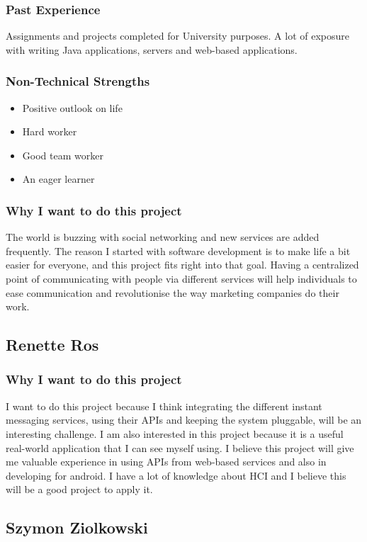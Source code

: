 \subsubsection{Past Experience}
Assignments and projects completed for University purposes. A lot of exposure with writing Java applications, servers and web-based applications.
\subsubsection{Non-Technical Strengths}
\begin{itemize}
	\item{Positive outlook on life}
	\item{Hard worker}
	\item{Good team worker}
	\item{An eager learner}
\end{itemize}
\subsubsection{Why I want to do this project}
The world is buzzing with social networking and new services are added frequently. The reason I started with software development is to make life a bit easier for everyone, and this project fits right into that goal. Having a centralized point of communicating with people via different services will help individuals to ease communication and revolutionise the way marketing companies do their work.

\pagebreak
\subsection{Renette Ros}

\subsubsection{Why I want to do this project} 
I want to do this project because I think integrating the different instant messaging services, using their APIs and keeping the system pluggable, will be an interesting challenge.  I am also interested in this project because it is a useful real-world application that I can see myself using. I believe this project will give me valuable experience in using APIs from web-based services and also in developing for android. I have a lot of knowledge about HCI and I believe this will be a good project to apply it.
 
\pagebreak
\subsection{Szymon Ziolkowski}

